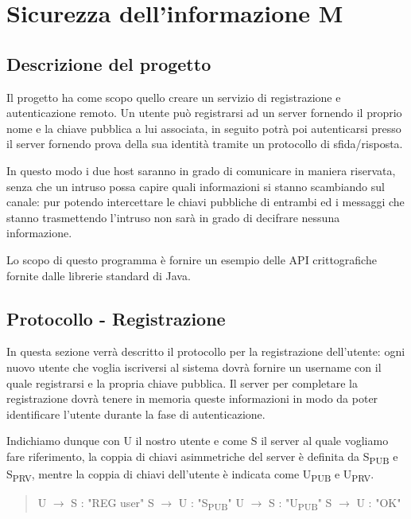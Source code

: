 \documentclass[12pt]{report}
\begin{document}
\chapter*{Sicurezza dell'informazione M}

\section*{Descrizione del progetto}

Il progetto ha come scopo quello creare un servizio di registrazione e autenticazione remoto. Un utente può registrarsi ad un server fornendo il proprio nome e la chiave pubblica a lui associata, in seguito potrà poi autenticarsi presso il server fornendo prova della sua identità tramite un protocollo di sfida/risposta. 

In questo modo i due host saranno in grado di comunicare in maniera riservata, senza che un intruso possa capire quali informazioni si stanno scambiando sul canale: pur potendo intercettare le chiavi pubbliche di entrambi ed i messaggi che stanno trasmettendo l'intruso non sarà in grado di decifrare nessuna informazione.

Lo scopo di questo programma è fornire un esempio delle API crittografiche fornite dalle librerie standard di Java.

\section*{Protocollo - Registrazione}

In questa sezione verrà descritto il protocollo per la registrazione dell'utente: ogni nuovo utente che voglia iscriversi al sistema dovrà fornire un username con il quale registrarsi e la propria chiave pubblica. Il server per completare la registrazione dovrà tenere in memoria queste informazioni in modo da poter identificare l'utente durante la fase di autenticazione.

Indichiamo dunque con U il nostro utente e come S il server al quale vogliamo fare riferimento, la coppia di chiavi asimmetriche del server è definita da S\textsubscript{PUB} e S\textsubscript{PRV}, mentre la coppia di chiavi dell'utente è indicata come U\textsubscript{PUB} e U\textsubscript{PRV}.

\begin{quote}
U $\rightarrow$ S : "REG user"\newline
S $\rightarrow$ U : "S\textsubscript{PUB}"\newline
U $\rightarrow$ S : "U\textsubscript{PUB}"\newline
S $\rightarrow$ U : "OK"\newline
\end{quote}
\end{document}
